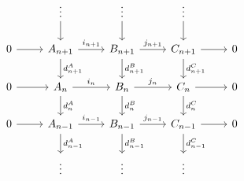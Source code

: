 $$\begin{tikzcd}[ampersand replacement=\&]
	\& \vdots \& \vdots \& \vdots \\
	0 \& {A_{n+1}} \& {B_{n+1}} \& {C_{n+1}} \& 0 \\
	0 \& {A_n} \& {B_n} \& {C_n} \& 0 \\
	0 \& {A_{n-1}} \& {B_{n-1}} \& {C_{n-1}} \& 0 \\
	\& \vdots \& \vdots \& \vdots
	\arrow[from=1-2, to=2-2]
	\arrow[from=1-3, to=2-3]
	\arrow[from=1-4, to=2-4]
	\arrow[from=2-1, to=2-2]
	\arrow["{i_{n+1}}", from=2-2, to=2-3]
	\arrow["{d_{n+1}^A}", from=2-2, to=3-2]
	\arrow["{j_{n+1}}", from=2-3, to=2-4]
	\arrow["{d_{n+1}^B}", from=2-3, to=3-3]
	\arrow[from=2-4, to=2-5]
	\arrow["{d_{n+1}^C}", from=2-4, to=3-4]
	\arrow[from=3-1, to=3-2]
	\arrow["{i_n}", from=3-2, to=3-3]
	\arrow["{d_{n}^A}", from=3-2, to=4-2]
	\arrow["{j_n}", from=3-3, to=3-4]
	\arrow["{d_{n}^B}", from=3-3, to=4-3]
	\arrow[from=3-4, to=3-5]
	\arrow["{d_{n}^C}", from=3-4, to=4-4]
	\arrow[from=4-1, to=4-2]
	\arrow["{i_{n-1}}", from=4-2, to=4-3]
	\arrow["{d_{n-1}^A}", from=4-2, to=5-2]
	\arrow["{j_{n-1}}", from=4-3, to=4-4]
	\arrow["{d_{n-1}^B}", from=4-3, to=5-3]
	\arrow[from=4-4, to=4-5]
	\arrow["{d_{n-1}^C}", from=4-4, to=5-4]
\end{tikzcd}$$
